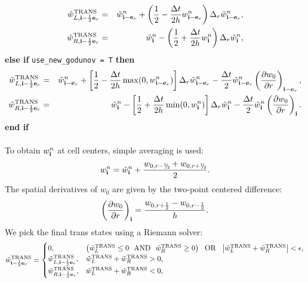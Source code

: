 \begin{eqnarray}
\tilde{w}_{L,{\bf i}-\frac{1}{2}{\bf e}_r}^{\rm TRANS} &=& \tilde{w}_{{\bf i}-{\bf e}_r}^n + \left(\frac{1}{2} - \frac{\Delta t}{2h}w_{{\bf i}-{\bf e}_r}^n\right)\Delta_r \tilde{w}_{{\bf i}-{\bf e}_r}^n,\label{Radial utrans_L} \\
\tilde{w}_{R,{\bf i}-\frac{1}{2}{\bf e}_r}^{\rm TRANS} &=& \tilde{w}_{{\bf i}}^n - \left(\frac{1}{2} + \frac{\Delta t}{2h}w_{{\bf i}}^n\right)\Delta_r \tilde{w}_{{\bf i}}^n,\label{Radial utrans_R}
\end{eqnarray}
{\bf else if} {\tt use\_new\_godunov = T} {\bf then}
\begin{eqnarray}
\tilde{w}_{L,{\bf i}-\frac{1}{2}{\bf e}_r}^{\rm TRANS} &=& \tilde{w}_{{\bf i}-{\bf e}_r}^n + \left[\frac{1}{2} - \frac{\Delta t}{2h}\max(0,w_{{\bf i}-{\bf e}_r}^n)\right]\Delta_r \tilde{w}_{{\bf i}-{\bf e}_r}^n - \frac{\Delta t}{2}\tilde{w}_{{\bf i}-{\bf e}_r}^n\left(\frac{\partial w_0}{\partial r}\right)_{{\bf i}-{\bf e}_r},\\
\tilde{w}_{R,{\bf i}-\frac{1}{2}{\bf e}_r}^{\rm TRANS} &=& \tilde{w}_{{\bf i}}^n - \left[\frac{1}{2} + \frac{\Delta t}{2h}\min(0,w_{{\bf i}}^n)\right]\Delta_r \tilde{w}_{{\bf i}}^n - \frac{\Delta t}{2}\tilde{w}_{{\bf i}}^n\left(\frac{\partial w_0}{\partial r}\right)_{{\bf i}}.
\end{eqnarray}
{\bf end if}\\ \\
To obtain $w_{{\bf i}}^n$ at cell centers, simple averaging is used:
\begin{equation}
w_{\ib}^n = \wt_{\ib}^n + \frac{w_{0,r-\myhalf} + w_{0,r+\myhalf}}{2}.
\label{Total Radial Velocity}
\end{equation}
The spatial derivatives of $w_0$ are given by the two-point centered
difference:
\begin{equation}
\left(\frac{\partial w_0}{\partial r}\right)_{{\bf i}} = \frac{w_{0,r+\frac{1}{2}}-w_{0,r-\frac{1}{2}}}{h}.\label{Radial Derivative of w_0}
\end{equation}
We pick the final trans states using a Riemann solver:
\begin{equation}
\tilde{w}^{\rm TRANS}_{{\bf i}-\frac{1}{2}{\bf e}_r} =
\begin{cases}
0, & \left(\tilde{w}_L^{\rm TRANS} \le 0 ~~ {\rm AND} ~~ \tilde{w}_R^{\rm TRANS} \ge 0\right) ~~ {\rm OR} ~~ \left|\tilde{w}_L^{\rm TRANS} + \tilde{w}_R^{\rm TRANS}\right| < \epsilon, \\
\tilde{w}_{L,{\bf i}-\frac{1}{2}{\bf e}_r}^{\rm TRANS}, & \tilde{w}_L^{\rm TRANS} + \tilde{w}_R^{\rm TRANS} > 0, \\
\tilde{w}_{R,{\bf i}-\frac{1}{2}{\bf e}_r}^{\rm TRANS}, & \tilde{w}_L^{\rm TRANS} + \tilde{w}_R^{\rm TRANS} < 0, \\
\end{cases}
\end{equation}
